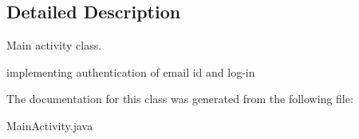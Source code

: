 \subsection{Detailed Description}
Main activity class. 

implementing authentication of email id and log-\/in 

The documentation for this class was generated from the following file\+:\begin{DoxyCompactItemize}
\item 
Main\+Activity.\+java\end{DoxyCompactItemize}
